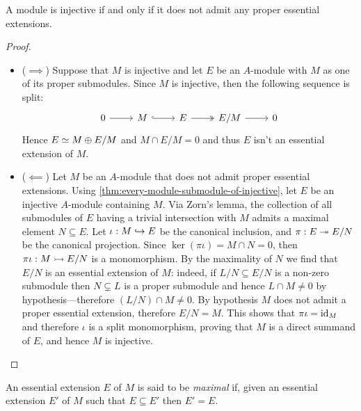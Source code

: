 \begin{lemma}
\label{lem:injective-iff-no-proper-essential-extensions}
A module is injective if and only if it does not admit any proper essential
extensions.
\end{lemma}

\begin{proof}
\begin{itemize}\setlength\itemsep{0em}
\item (\(\implies\)) Suppose that \(M\) is injective and let \(E\) be an
  \(A\)-module with \(M\) as one of its proper submodules. Since \(M\) is
  injective, then the following sequence is split:
  \[
  \begin{tikzcd}
  0 \ar[r] &M \ar[r, hook] &E \ar[r, two heads] &E/M \ar[r] &0
  \end{tikzcd}
  \]
  Hence \(E \simeq M \oplus E/M\) and \(M \cap E/M = 0\) and thus \(E\) isn't an essential
  extension of \(M\).

\item (\(\impliedby\)) Let \(M\) be an \(A\)-module that does not admit proper
  essential extensions. Using \cref{thm:every-module-submodule-of-injective},
  let \(E\) be an injective \(A\)-module containing \(M\). Via Zorn's lemma, the
  collection of all submodules of \(E\) having a trivial intersection with \(M\)
  admits a maximal element \(N \subseteq E\). Let \(\iota: M \hookrightarrow E\) be the canonical
  inclusion, and \(\pi: E \twoheadrightarrow E/N\) be the canonical projection. Since \(\ker(\pi
  \iota) = M \cap N = 0\), then \(\pi \iota: M \rightarrowtail E/N\) is a monomorphism. By the
  maximality of \(N\) we find that \(E/N\) is an essential extension of \(M\):
  indeed, if \(L/N \subseteq E/N\) is a non-zero submodule then \(N \subsetneq L\) is a proper
  submodule and hence \(L \cap M \neq 0\) by hypothesis---therefore \((L/N) \cap M \neq
  0\). By hypothesis \(M\) does not admit a proper essential extension,
  therefore \(E/N = M\). This shows that \(\pi \iota = \operatorname{id}_M\) and therefore \(\iota\) is
  a split monomorphism, proving that \(M\) is a direct summand of \(E\), and
  hence \(M\) is injective.
\end{itemize}
\end{proof}

\begin{definition}
\label{def:maximal-essential-extension}
An essential extension \(E\) of \(M\) is said to be \emph{maximal} if, given an
essential extension \(E'\) of \(M\) such that \(E \subseteq E'\) then \(E' = E\).
\end{definition}

